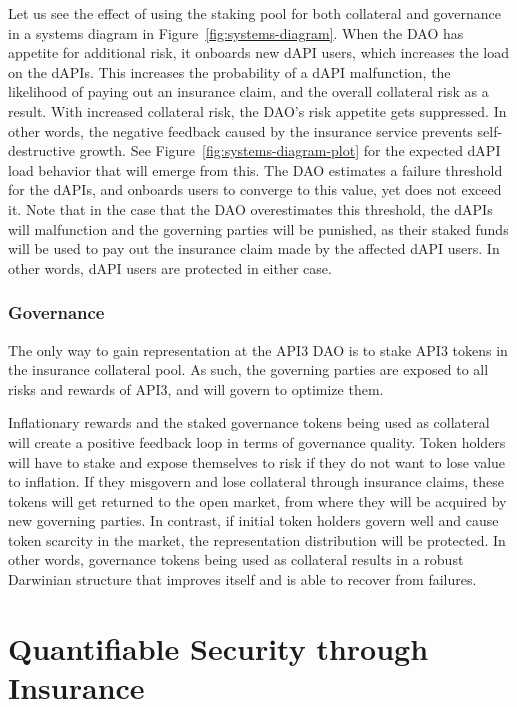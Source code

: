 \documentclass[11pt]{article}
\begin{document}
Let us see the effect of using the staking pool for both collateral and governance in a systems diagram in Figure~\ref{fig:systems-diagram}.
When the DAO has appetite for additional risk, it onboards new dAPI users, which increases the load on the dAPIs.
This increases the probability of a dAPI malfunction, the likelihood of paying out an insurance claim, and the overall collateral risk as a result.
With increased collateral risk, the DAO’s risk appetite gets suppressed.
In other words, the negative feedback caused by the insurance service prevents self-destructive growth.
See Figure~\ref{fig:systems-diagram-plot} for the expected dAPI load behavior that will emerge from this.
The DAO estimates a failure threshold for the dAPIs, and onboards users to converge to this value, yet does not exceed it.
Note that in the case that the DAO overestimates this threshold, the dAPIs will malfunction and the governing parties will be punished, as their staked funds will be used to pay out the insurance claim made by the affected dAPI users.
In other words, dAPI users are protected in either case.

\subsubsection{Governance}
\label{sec:governance}

The only way to gain representation at the API3 DAO is to stake API3 tokens in the insurance collateral pool.
As such, the governing parties are exposed to all risks and rewards of API3, and will govern to optimize them.

Inflationary rewards and the staked governance tokens being used as collateral will create a positive feedback loop in terms of governance quality.
Token holders will have to stake and expose themselves to risk if they do not want to lose value to inflation.
If they misgovern and lose collateral through insurance claims, these tokens will get returned to the open market, from where they will be acquired by new governing parties.
In contrast, if initial token holders govern well and cause token scarcity in the market, the representation distribution will be protected.
In other words, governance tokens being used as collateral results in a robust Darwinian structure that improves itself and is able to recover from failures.


\section{Quantifiable Security through Insurance}
\label{sec:quantifiable-security-through-insurance}
\end{document}
